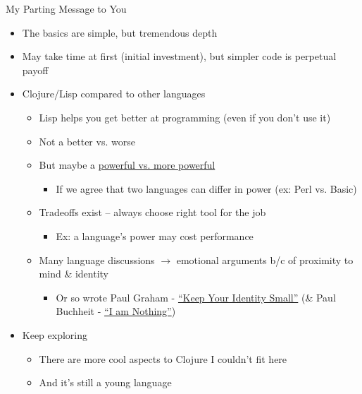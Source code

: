 \documentclass{beamer}
\begin{document}
\begin{frame}{My Parting Message to You}
  \begin{itemize}
  \item The basics are simple, but tremendous depth
  \item May take time at first (initial investment), but simpler code is
    perpetual payoff
  \item Clojure/Lisp compared to other languages
    \begin{itemize}
    \item Lisp helps you get better at programming (even if you don't
      use it)
    \item Not a better vs. worse
    \item But maybe a \href{http://www.paulgraham.com/avg.html}{powerful vs. more powerful}
      \begin{itemize}
      \item If we agree that two languages can differ in power (ex:
        Perl vs. Basic)
      \end{itemize}
    \item Tradeoffs exist -- always choose right tool for the job
      \begin{itemize}
      \item Ex: a language's power may cost performance
      \end{itemize}
    \item Many language discussions $\rightarrow$ emotional arguments b/c of proximity
      to mind \& identity
      \begin{itemize}
      \item Or so wrote Paul Graham -
        \href{http://www.paulgraham.com/identity.html}{``Keep Your
        Identity Small''} (\& Paul Buchheit -
        \href{http://paulbuchheit.blogspot.com/2011/08/i-am-nothing.html}{``I
        am Nothing''})
      \end{itemize}
    \end{itemize}
  \item Keep exploring
    \begin{itemize}
    \item There are more cool aspects to Clojure I couldn't fit here
    \item And it's still a young language
    \end{itemize}
  \end{itemize}
\end{frame}
\end{document}
